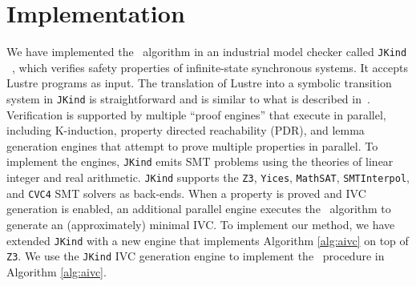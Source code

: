 \section{Implementation}
\label{sec:impl}
We have implemented the \aivcalg ~algorithm
in an industrial model checker called \texttt{JKind} ~\cite{jkind},
which verifies safety properties of  infinite-state synchronous systems.
It accepts Lustre programs \cite{Halbwachs91:lustre} as input.  The translation of Lustre
into a symbolic transition system in \texttt{JKind} is straightforward and is similar to what is described
in~\cite{Hagen08:FMCAD}.
Verification is supported by multiple ``proof engines'' that execute in parallel, including K-induction,
property directed reachability (PDR), and lemma generation engines that attempt to prove
multiple properties in parallel.  To implement the engines,
\texttt{JKind} emits SMT problems using the theories of linear integer and real arithmetic.  \texttt{JKind} supports the 
\texttt{Z3}, \texttt{Yices}, \texttt{MathSAT}, \texttt{SMTInterpol}, and \texttt{CVC4} SMT solvers as back-ends.  When a property is
proved and IVC generation is enabled, an additional parallel engine
executes the \ucalg ~algorithm \cite{Ghass16} to generate an (approximately) minimal IVC.
%
To implement our method, we have extended \texttt{JKind} with a new engine that
implements Algorithm \ref{alg:aivc} on top of \texttt{Z3}.
We use the \texttt{JKind} IVC generation engine to implement the \getivc\ procedure in  Algorithm \ref{alg:aivc}.

